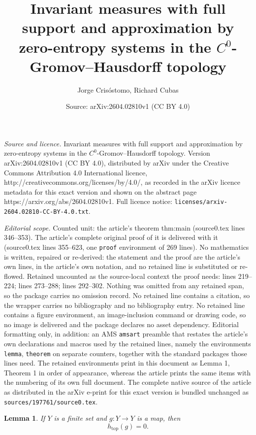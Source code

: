\documentclass[10pt,a4paper]{amsart}
\title{Invariant measures with full support and approximation by zero-entropy systems in the $C^0$-Gromov--Hausdorff topology}
\author{Jorge Crisóstomo, Richard Cubas}
\date{Source: arXiv:2604.02810v1 (CC BY 4.0)}
\newtheorem{lemma}{Lemma}
\DeclareMathOperator{\topo}{top}
\begin{document}
\maketitle

\noindent\emph{Source and licence.} Invariant measures with full support and approximation by zero-entropy systems in the $C^0$-Gromov--Hausdorff topology. Version arXiv:2604.02810v1 (CC BY 4.0), distributed by arXiv under the Creative Commons Attribution 4.0 International licence, http://creativecommons.org/licenses/by/4.0/, as recorded in the arXiv licence metadata for this exact version and shown on the abstract page https://arxiv.org/abs/2604.02810v1. Full licence notice: \texttt{licenses/arxiv-2604.02810-CC-BY-4.0.txt}.\par\smallskip

\noindent\textit{Editorial scope.} Counted unit: the article's theorem thm:main (source0.tex lines 346--353). The article's complete original proof of it is delivered with it (source0.tex lines 355--623, one \texttt{proof} environment of 269 lines). No mathematics is written, repaired or re-derived: the statement and the proof are the article's own lines, in the article's own notation, and no retained line is substituted or re-flowed.  Retained uncounted as the source-local context the proof needs: lines 219--224; lines 273--288; lines 292--302.  Nothing was omitted from any retained span, so the package carries no omission record.  No retained line contains a citation, so the wrapper carries no bibliography and no bibliography entry.  No retained line contains a figure environment, an image-inclusion command or drawing code, so no image is delivered and the package declares no asset dependency.  Editorial formatting only, in addition: an AMS \texttt{amsart} preamble that restates the article's own declarations and macros used by the retained lines, namely the environments \texttt{lemma}, \texttt{theorem} on separate counters, together with the standard packages those lines need.  The retained environments print in this document as Lemma 1, Theorem 1 in order of appearance, whereas the article prints the same items with the numbering of its own full document.  The complete native source of the article as distributed in the arXiv e-print for this exact version is bundled unchanged as \texttt{sources/197761/source0.tex}.
\begin{lemma}\label{lem:finite_entropy_zero}
If $Y$ is a finite set and $g:Y\to Y$ is a map, then
\[
h_{\topo}(g)=0.
\]
\end{lemma}
\end{document}

